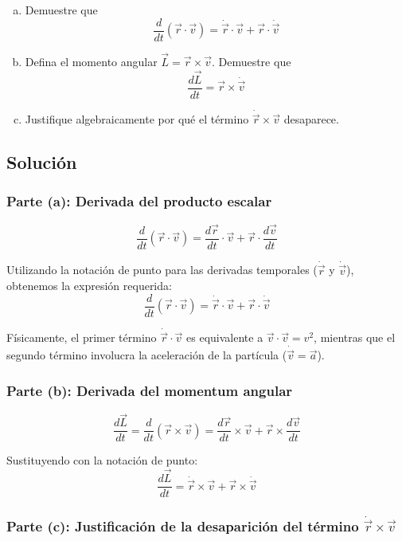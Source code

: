 \documentclass[12pt, letterpaper]{article}
\begin{document}
\begin{enumerate}[a)]
    \item Demuestre que
    $$ \frac{d}{dt}(\vec{r} \cdot \vec{v}) = \dot{\vec{r}} \cdot \vec{v} + \vec{r} \cdot \dot{\vec{v}} $$
    \item Defina el momento angular $\vec{L} = \vec{r} \times \vec{v}$. Demuestre que
    $$ \frac{d\vec{L}}{dt} = \vec{r} \times \dot{\vec{v}} $$
    \item Justifique algebraicamente por qué el término $\dot{\vec{r}} \times \vec{v}$ desaparece.
\end{enumerate}

\subsection{Solución}

\subsubsection*{Parte (a): Derivada del producto escalar}

$$ \frac{d}{dt}(\vec{r} \cdot \vec{v}) = \frac{d\vec{r}}{dt} \cdot \vec{v} + \vec{r} \cdot \frac{d\vec{v}}{dt} $$

Utilizando la notación de punto para las derivadas temporales ($\dot{\vec{r}}$ y $\dot{\vec{v}}$), obtenemos la expresión requerida:
$$ \frac{d}{dt}(\vec{r} \cdot \vec{v}) = \dot{\vec{r}} \cdot \vec{v} + \vec{r} \cdot \dot{\vec{v}} $$

Físicamente, el primer término $\dot{\vec{r}} \cdot \vec{v}$ es equivalente a $\vec{v} \cdot \vec{v} = v^2$, mientras que el segundo término involucra la aceleración de la partícula ($\dot{\vec{v}} = \vec{a}$).

\subsubsection*{Parte (b): Derivada del momentum angular}

$$ \frac{d\vec{L}}{dt} = \frac{d}{dt}(\vec{r} \times \vec{v}) = \frac{d\vec{r}}{dt} \times \vec{v} + \vec{r} \times \frac{d\vec{v}}{dt} $$

Sustituyendo con la notación de punto:
$$ \frac{d\vec{L}}{dt} = \dot{\vec{r}} \times \vec{v} + \vec{r} \times \dot{\vec{v}} $$

\subsubsection*{Parte (c): Justificación de la desaparición del término $\dot{\vec{r}} \times \vec{v}$}
\end{document}

